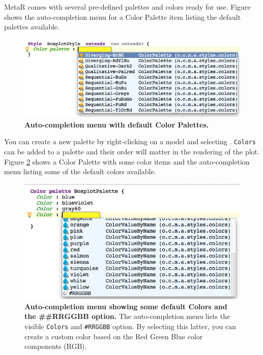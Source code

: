 MetaR comes with several pre-defined palettes and colors ready for use. Figure shows the auto-completion menu for a Color Palette item listing the default palettes available.

\begin{figure}[h!tbp]
  \centering
  \includegraphics[width=\figWidthWide]{figures/ColorPaletteItem.png}
\caption[Color Palette Item.]{\textbf{Auto-completion menu with default Color Palettes.}}
\label{fig:ColorPaletteItem}
\end{figure}

You can create a new palette by right-clicking on a model and selecting . \texttt{Colors} can be added to a palette and their order will matter in the rendering of the plot. Figure \ref{fig:ColorItem} shows a Color Palette with some color items and the auto-completion menu listing some of the default colors available.

\begin{figure}[h!tbp]
  \centering
  \includegraphics[width=\figWidthWide]{figures/ColorItem.png}
\caption[Color Item.]{\textbf{Auto-completion menu showing some default Colors and the \#\#RRGGBB option.} The auto-completion menu lists the visible \texttt{Colors} and \texttt{\#RRGGBB} option. By selecting this latter, you can create a custom color based on the Red Green Blue color components (RGB).}
\label{fig:ColorItem}
\end{figure}

